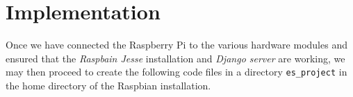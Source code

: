 \section{Implementation}

	Once we have connected the Raspberry Pi to the various hardware modules and ensured that the \textit{Raspbain Jesse} installation and \textit{Django server} are working, we may then proceed to create the following code files in a directory \texttt{es\_project} in the home directory of the Raspbian installation. 

	
